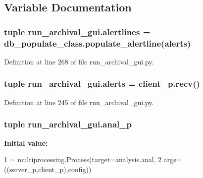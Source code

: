 \subsection{Variable Documentation}
\hypertarget{namespacerun__archival__gui_aed1f848fe03adbd8a175023f71246c2f}{
\subsubsection[{alertlines}]{\setlength{\rightskip}{0pt plus 5cm}tuple run\-\_\-archival\-\_\-gui.\-alertlines = db\-\_\-populate\-\_\-class.\-populate\-\_\-alertline({\bf alerts})}}\label{namespacerun__archival__gui_aed1f848fe03adbd8a175023f71246c2f}


Definition at line 268 of file run\-\_\-archival\-\_\-gui.\-py.

\hypertarget{namespacerun__archival__gui_a3e4b04aca47acb89e6fa3ae1b54ced46}{
\subsubsection[{alerts}]{\setlength{\rightskip}{0pt plus 5cm}tuple run\-\_\-archival\-\_\-gui.\-alerts = client\-\_\-p.\-recv()}}\label{namespacerun__archival__gui_a3e4b04aca47acb89e6fa3ae1b54ced46}


Definition at line 245 of file run\-\_\-archival\-\_\-gui.\-py.

\hypertarget{namespacerun__archival__gui_a7be598f74e925475644c60e7d7de9f85}{
\subsubsection[{anal\-\_\-p}]{\setlength{\rightskip}{0pt plus 5cm}tuple run\-\_\-archival\-\_\-gui.\-anal\-\_\-p}}\label{namespacerun__archival__gui_a7be598f74e925475644c60e7d7de9f85}
{\bfseries Initial value\-:}
\begin{DoxyCode}
1 = multiprocessing.Process(target=analysis.anal,
2                     args=((server\_p,client\_p),config))
\end{DoxyCode}


